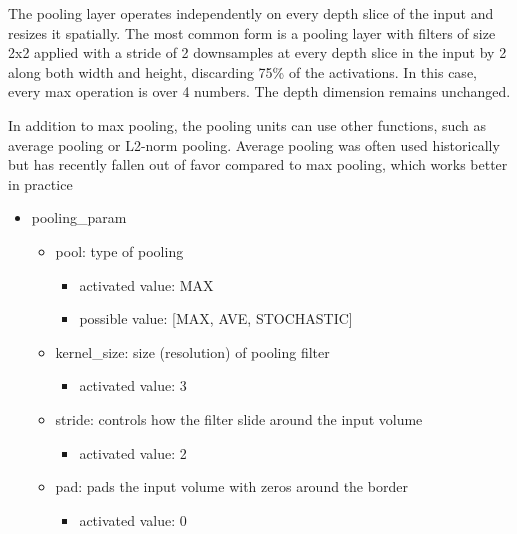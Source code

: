 \documentclass[11pt]{article}
\begin{document}
The pooling layer operates independently on every depth slice of the input and resizes it spatially. The most common form is a pooling layer with filters of size 2x2 applied with a stride of 2 downsamples at every depth slice in the input by 2 along both width and height, discarding 75\% of the activations. In this case, every max operation is over 4 numbers. The depth dimension remains unchanged.

In addition to max pooling, the pooling units can use other functions, such as average pooling or L2-norm pooling. Average pooling was often used historically but has recently fallen out of favor compared to max pooling, which works better in practice
\begin{itemize}
	\item pooling\_param
	\begin{itemize}
		\item pool: type of pooling
		\begin{itemize}
			\item activated value: MAX
			\item possible value: [MAX, AVE, STOCHASTIC]
		\end{itemize}
		\item kernel\_size: size (resolution) of pooling filter
		\begin{itemize}
			\item activated value: 3
		\end{itemize}
		\item stride: controls how the filter slide around the input volume
		\begin{itemize}
			\item activated value: 2
		\end{itemize}
		\item pad: pads the input volume with zeros around the border
		\begin{itemize}
			\item activated value: 0
		\end{itemize}
	\end{itemize}
\end{itemize}
\end{document}

